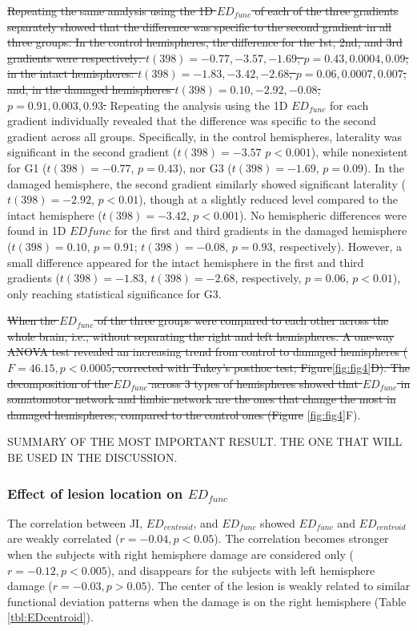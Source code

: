 \documentclass[fleqn,10pt]{wlscirep}
\begin{document}
\color{red}\st{Repeating the same analysis using the 1D $\textit{ED}_{{func}}$ of each of the three gradients separately showed that the difference was specific to the second gradient in all three groups. In the control hemispheres, the difference for the 1st, 2nd, and 3rd gradients were respectively: $t(398) = -0.77, -3.57, -1.69$, $p = 0.43, 0.0004, 0.09$; in the intact hemispheres: $t(398) = -1.83, -3.42, -2.68$, $p = 0.06, 0.0007, 0.007$; and, in the damaged hemispheres  $t(398) = 0.10, -2.92, -0.08$, $p = 0.91, 0.003, 0.93$.}\color{blue} Repeating the analysis using the 1D $\textit{ED}_{{func}}$ for each gradient individually revealed that the difference was specific to the second gradient across all groups. Specifically, in the control hemispheres, laterality was significant in the second gradient ($t(398) = -3.57$ $p<0.001$), while nonexistent for G1 ($t(398) = -0.77$, $p=0.43$), nor G3 ($t(398)=-1.69$, $p=0.09$). In the damaged hemisphere, the second gradient similarly showed significant laterality ($t(398) = -2.92$, $p < 0.01$), though at a slightly reduced level compared to the intact hemisphere ($t(398) = -3.42$, $p < 0.001$). No hemispheric differences were found in 1D $\textit{ED}{{func}}$ for the first and third gradients in the damaged hemisphere ($t(398) = 0.10$, $p = 0.91$; $t(398) = -0.08$, $p = 0.93$, respectively). However, a small difference appeared for the intact hemisphere in the first and third gradients ($t(398) = -1.83$, $t(398) = -2.68$, respectively, $p=0.06$, $p<0.01$), only reaching statistical significance for G3.\color{black}

\color{red}\st{When the $\textit{ED}_{{func}}$ of the three groups were compared to each other across the whole brain, i.e., without separating the right and left hemispheres. A one-way ANOVA test revealed an increasing trend from control to damaged hemispheres ($F=46.15, p < 0.0005$, corrected with Tukey's posthoc test; Figure}\ref{fig:fig4}\st{D). The decomposition of the $\textit{ED}_{{func}}$ across 3 types of hemispheres showed that $\textit{ED}_{{func}}$ in somatomotor network and limbic network are the ones that change the most in damaged hemispheres, compared to the control ones (Figure}  \ref{fig:fig4}F).

\color{purple} 
SUMMARY OF THE MOST IMPORTANT RESULT. THE ONE THAT WILL BE USED IN THE DISCUSSION.
\color{black}

\subsubsection*{Effect of lesion location on $\textit{ED}_{{func}}$}
The correlation between JI, $\textit{ED}_{{centroid}}$, and $\textit{ED}_{{func}}$ showed $\textit{ED}_{{func}}$ and $\textit{ED}_{{centroid}}$ are weakly correlated ($ r = -0.04, p < 0.05$). The correlation becomes stronger when the subjects with right hemisphere damage are considered only ($ r = -0.12, p < 0.005$), and disappears for the subjects with left hemisphere damage ($ r = -0.03, p > 0.05$). The center of the lesion is weakly related to similar functional deviation patterns when the damage is on the right hemisphere (Table \ref{tbl:EDcentroid}). 
\end{document}
